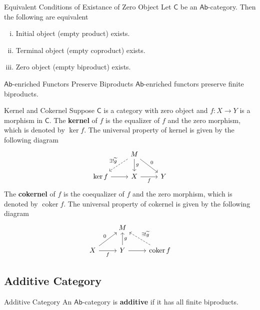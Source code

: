\begin{proposition}{Equivalent Conditions of Existance of Zero Object}{}
    Let $\mathsf{C}$ be an $\mathsf{Ab}$-category. Then the following are equivalent
    \begin{enumerate}[(i)]
        \item Initial object (empty product) exists.
        \item Terminal object (empty coproduct) exists.
        \item Zero object (empty biproduct) exists.
    \end{enumerate}
\end{proposition}

\begin{proposition}{$\mathsf{Ab}$-enriched Functors Preserve Biproducts}{}
    $\mathsf{Ab}$-enriched functors preserve finite biproducts.
\end{proposition}


\begin{definition}{Kernel and Cokernel}{}
    Suppose $\mathsf{C}$ is a category with zero object and $f:X\to Y$ is a morphism in $\mathsf{C}$. The \textbf{kernel} of $f$ is the equalizer of $f$ and the zero morphism, which is denoted by $\ker f$. The universal property of kernel is given by the following diagram
    \[
    \begin{tikzcd}[ampersand replacement=\&]
        \& M \arrow[d, "g"] \arrow[rd, "0"] \arrow[ld, "\exists!\widetilde{g}"', dashed] \&   \\
        \ker f \arrow[r] \& X \arrow[r, "f"']                                                             \& Y
    \end{tikzcd}
    \]
    The \textbf{cokernel} of $f$ is the coequalizer of $f$ and the zero morphism, which is denoted by $\operatorname{coker}f$. The universal property of cokernel is given by the following diagram
    \[
    \begin{tikzcd}[ampersand replacement=\&]
        \& M                           \&                                                                     \\
        X \arrow[r, "f"'] \arrow[ru, "0"] \& Y \arrow[u, "g"'] \arrow[r] \& \operatorname{coker} f \arrow[lu, "\exists!\widetilde{g}"', dashed]
        \end{tikzcd}
    \]

\end{definition}


\subsection{Additive Category}
\begin{definition}{Additive Category}{}
    An $\mathsf{Ab}$-category is \textbf{additive} if it has all finite biproducts.
\end{definition}




